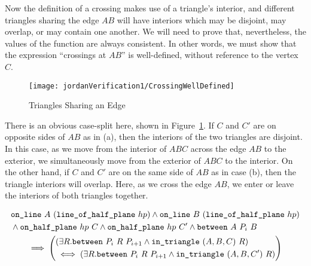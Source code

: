 Now the definition of a crossing makes use of a triangle's interior, and different triangles sharing the edge $AB$ will have interiors which may be disjoint, may overlap, or may contain one another. We will need to prove that, nevertheless, the values of the function  are always consistent. In other words, we must show that the expression ``crossings at $AB$'' is well-defined, without reference to the vertex $C$.

\begin{figure}
\centering\texttt{[image: jordanVerification1/CrossingWellDefined]}
\caption{Triangles Sharing an Edge}
\label{fig:CrossingWellDefined}
\end{figure}

There is an obvious case-split here, shown in Figure~\ref{fig:CrossingWellDefined}. If $C$ and $C'$ are on opposite sides of $AB$ as in (a), then the interiors of the two triangles are disjoint. In this case, as we move from the interior of $ABC$ across the edge $AB$ to the exterior, we simultaneously move from the exterior of $ABC$ to the interior. On the other hand, if $C$ and $C'$ are on the same side of $AB$ as in case (b), then the triangle interiors will overlap. Here, as we cross the edge $AB$, we enter or leave the interiors of both triangles together. 

\begin{multline}\label{eq:crossChangeLemma1}
  \begin{aligned}
    &\texttt{on\_line}\ A\ (\texttt{line\_of\_half\_plane}\ hp) \wedge \texttt{on\_line}\ B\ (\texttt{line\_of\_half\_plane}\ hp)\\
    &\wedge\texttt{on\_half\_plane}\ hp\ C \wedge \texttt{on\_half\_plane}\ hp\ C'\wedge\texttt{between}\ A\ P_i\ B
  \end{aligned}\\
  \implies\left(\begin{aligned} 
      &(\exists R. \texttt{between}\ P_i\ R\ P_{i+1} \wedge \texttt{in\_triangle}\ (A,B,C)\ R)\\
      & \iff (\exists R. \texttt{between}\ P_i\ R\ P_{i+1} \wedge \texttt{in\_triangle}\ (A,B,C')\ R)
  \end{aligned}\right)
\end{multline}

